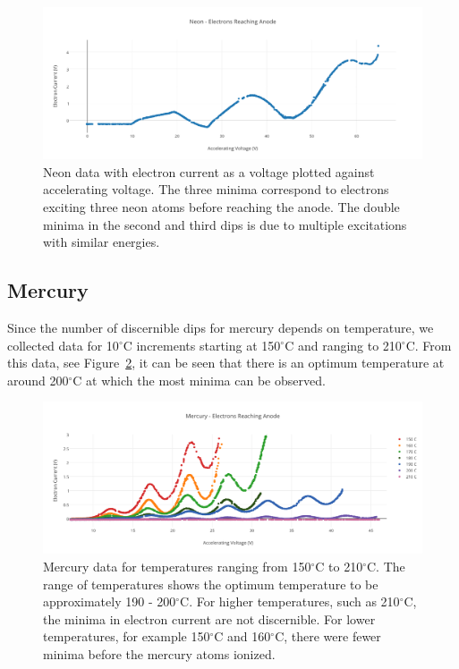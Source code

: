 \documentclass[prb,preprint]{revtex4-1}
\begin{document}
\begin{figure}[h!]
\centering

\includegraphics[width=6in]{neon_data.pdf}
\caption{Neon data with electron current as a voltage plotted against accelerating voltage. The three minima correspond to electrons exciting three neon atoms before reaching the anode. The double minima in the second and third dips is due to multiple excitations with similar energies.}

\label{neon_data}
\end{figure}


\subsection{Mercury}

Since the number of discernible dips for mercury depends on temperature, we collected data for 10$^{\circ}$C increments starting at 150$^{\circ}$C and ranging to 210$^{\circ}$C. From this data, see Figure~\ref{hg_data}, it can be seen that there is an optimum temperature at around 200$^{\circ}$C at which the most minima can be observed. 

\begin{figure}[h!]
\centering

\includegraphics[width=6in]{hg_data.pdf}
\caption{Mercury data for temperatures ranging from 150$^{\circ}$C to 210$^{\circ}$C. The range of temperatures shows the optimum temperature to be approximately 190 - 200$^{\circ}$C. For higher temperatures, such as 210$^{\circ}$C, the minima in electron current are not discernible. For lower temperatures, for example 150$^{\circ}$C and 160$^{\circ}$C, there were fewer minima before the mercury atoms ionized.}

\label{hg_data}
\end{figure}
\end{document}

